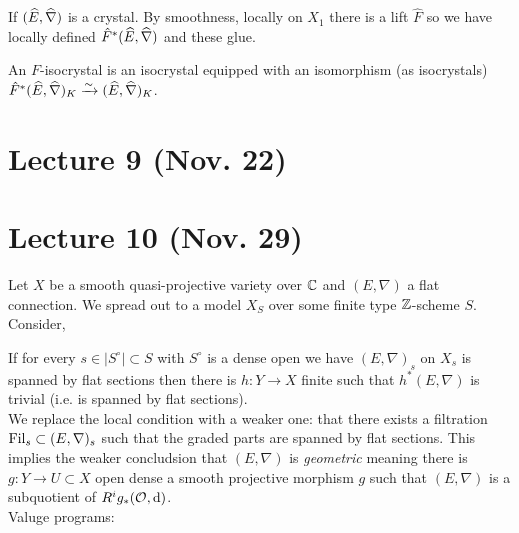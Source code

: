 \documentclass[12pt]{article}
\begin{document}
\begin{theorem}
If $(\widehat{E}, \widehat{\nabla})$ is a crystal. By smoothness, locally on $X_1$ there is a lift $\hat{F}$ so we have locally defined $\hat{F}^* (\widehat{E}, \widehat{\nabla})$ and these glue.
\end{theorem}

\begin{defn}
An $F$-isocrystal is an isocrystal equipped with an isomorphism (as isocrystals) $\hat{F}^* (\widehat{E}, \widehat{\nabla})_K \xrightarrow{\sim} (\widehat{E}, \widehat{\nabla})_K$.
\end{defn}


\section{Lecture 9 (Nov. 22)}



\section{Lecture 10 (Nov. 29)}

Let $X$ be a smooth quasi-projective variety over $\mathbb{C}$ and $(E, \nabla)$ a flat connection. We spread out to a model $X_S$ over some finite type $\mathbb{Z}$-scheme $S$. Consider,
\begin{center}
\end{center}

If for every $s \in |S^\circ| \subset S$ with $S^\circ$ is a dense open we have $(E, \nabla)_s$ on $X_s$ is spanned by flat sections then there is $h : Y \to X$ finite \etale such that $h^*(E, \nabla)$ is trivial (i.e. is spanned by flat sections). 
\bigskip\\
We replace the local condition with a weaker one: that there exists a filtration $\mathrm{Fil}_s \subset (E, \nabla)_s$ such that the graded parts are spanned by flat sections. This implies the weaker concludsion that $(E, \nabla)$ is \textit{geometric} meaning there is $g : Y \to U \subset X$ open dense a smooth projective morphism $g$ such that $(E, \nabla)$ is a subquotient of $R^i g_* (\mathcal{O}_{}, \mathrm{d})$. 
\bigskip\\
Valuge programs:
\end{document}
